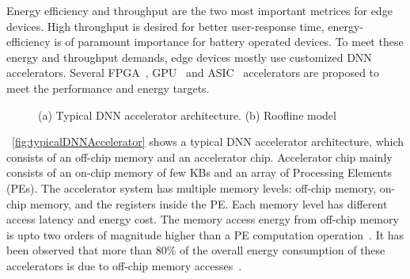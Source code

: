 \documentclass[a4paper,10pt]{article}
\begin{document}
Energy efficiency and throughput are the two most important metrices for edge devices. High throughput is desired for better user-response time, energy-efficiency is of paramount importance for battery operated devices. To meet these energy and throughput demands, edge devices mostly use customized DNN accelerators.
Several FPGA~\cite{zhang2015optimizing,wei2019overcoming,gokhale2014240,8742284,gupta2015deep,alwani2016fused}, GPU~\cite{chetlur2014cudnn} and ASIC~\cite{Chen2016EyerissAS,chen2014diannao,chen2014dadiannao,du2015shidiannao} accelerators are proposed to meet the performance and energy targets. 
\begin{figure}[!htb]
	\centering
	\hfil
	\caption{(a) Typical DNN accelerator architecture. (b) Roofline model}
	\label{fig:acceleratorAndRoofline}
	\vspace{-1.0em}	
\end{figure}
\figurename{~\ref{fig:typicalDNNAccelerator}} shows a typical DNN accelerator architecture, which consists of an off-chip memory and an accelerator chip. Accelerator chip mainly consists of an on-chip memory of few KBs and an array of Processing Elements (PEs). The accelerator system has multiple memory levels: off-chip memory, on-chip memory, and the registers inside the PE. Each memory level has different access latency and energy cost. The memory access energy from off-chip memory is upto two orders of magnitude higher than a PE computation operation~\cite{Chen2016EyerissAS}. It has been observed that more than 80\% of the overall energy consumption of these accelerators is due to off-chip memory accesses~\cite{chen2014diannao}. 
\end{document}
